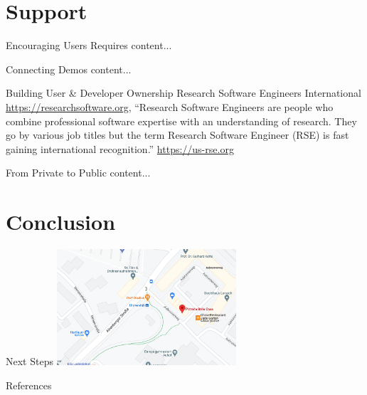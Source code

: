 \documentclass[11pt,compress,xcolor={usenames,dvipsnames},aspectratio=169]{beamer}
\begin{document}
\section{Support}
\begin{frame}{Encouraging Users Requires}
	content...
\end{frame}

\begin{frame}{Connecting Demos}
	content...
\end{frame}

\begin{frame}{Building User \& Developer Ownership}
 Research Software Engineers International 	\url{https://researchsoftware.org}, ``Research Software Engineers are people who combine professional software expertise with an understanding of research. They go by various job titles but the term Research Software Engineer (RSE) is fast gaining international recognition.''
  \url{https://us-rse.org}
\end{frame}

\begin{frame}{From Private to Public}
	content...
\end{frame}

\section{Conclusion}

\begin{frame}{Next Steps}
	\includegraphics[width=0.5\textwidth]{ProgramsImages/PizeriaBellaCasa.png}
\end{frame}

\begin{frame}[allowframebreaks]{References}
	\printbibliography
\end{frame}
\end{document}
